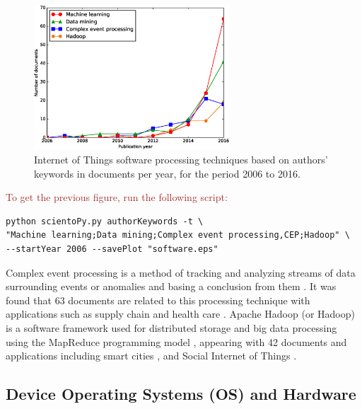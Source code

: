 \documentclass[symmetry,article,accept,moreauthors,pdftex10pt,a4paper]{mdpi}
\newcommand{\figuresWidth}{0.65\textwidth}
\begin{document}
\begin{figure}[H]
	\centering
	\includegraphics[width=\figuresWidth]{./graphs/figure7.eps}
	\caption{Internet of Things software processing techniques based on authors' keywords in documents per year, for the period 2006 to 2016.}
	\label{fig_software_processing}
\end{figure} 

\noindent
\textcolor{brown}{To get the previous figure, run the following script:}\\
\begin{verbatim}
python scientoPy.py authorKeywords -t \
"Machine learning;Data mining;Complex event processing,CEP;Hadoop" \
--startYear 2006 --savePlot "software.eps"
\end{verbatim}

Complex event processing is a method of tracking and analyzing streams of data surrounding events or anomalies and basing a conclusion from them \cite{Luckham:2001:PEI:515781}. It was found that 63 documents are related to this processing  technique with applications such as supply chain \cite{Li20131481,li2013,Liu2015} and health care \cite{Mohamedali201650,Sheriff2015}. Apache Hadoop (or Hadoop) is a software framework used for distributed storage and big data processing using the MapReduce programming model \cite{White:2009:HDG:1717298}, appearing with 42 documents and applications including smart cities \cite{Ji201422372,Hans2016352,TahmassebpourS1442}, and Social Internet of Things \cite{Ahmad20161101}.


\subsection{Device Operating Systems (OS) and Hardware}
\end{document}

